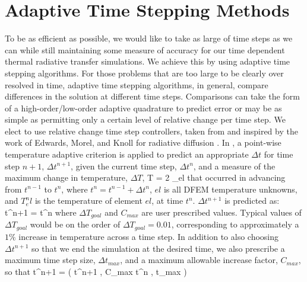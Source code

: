 \section{Adaptive Time Stepping Methods}
\label{sec:chap6_adaptive}

To be as efficient as possible, we would like to take as large of time steps as we can while still maintaining some measure of accuracy for our time dependent thermal radiative transfer simulations.
We achieve this by using adaptive time stepping algorithms.
For those problems that are too large to be clearly over resolved in time, adaptive time stepping algorithms, in general, compare differences in the solution at different time steps.
Comparisons can take the form of a high-order/low-order adaptive quadrature to predict error or may be as simple as permitting only a certain level of relative change per time step.
We elect to use relative change time step controllers, taken from and inspired by the work of Edwards, Morel, and Knoll for radiative diffusion \cite{time_adaptive_diffusion}.
In \cite{time_adaptive_diffusion}, a point-wise temperature adaptive criterion is applied to predict an appropriate $\Delta t$ for time step $n+1$, $\Delta t^{n+1}$, given the current time step, $\Delta t^n$, and a measure of the maximum change in temperature, $\Delta T$, 
\benum
\Delta T = 2 \max_{el}  \pec 
\label{eq:pointwise_adaptive}
\eenum
that occurred in advancing from $t^{n-1}$ to $t^n$, where $t^n = t^{n-1} + \Delta t^n$, $el$ is all DFEM temperature unknowns, and $T^{n}_el$ is the temperature of element $el$, at time $t^n$.
$\Delta t^{n+1}$ is predicted as:
\benum
\Delta t^{n+1} =  \Delta t^n  \pec
\label{eq:adaptive_change}
\eenum
where $\Delta T_{goal}$ and $C_{max}$ are user prescribed values.  
Typical values of $\Delta T_{goal}$ would be on the order of $\Delta T_{goal} = 0.01$, corresponding to approximately a $1\%$  increase in temperature across a time step.
In addition to also choosing $\Delta t^{n+1}$ so that we end the simulation at the desired time, we also prescribe a maximum time step size, $\Delta t_{max}$, and a maximum allowable increase factor, $C_{max}$, so that
\benum
\Delta t^{n+1} = \min \left( \Delta t^{n+1} , C_{max} \Delta t^n , \Delta t_{max}  \right) \pep
\label{eq:min_dt}
\eenum

